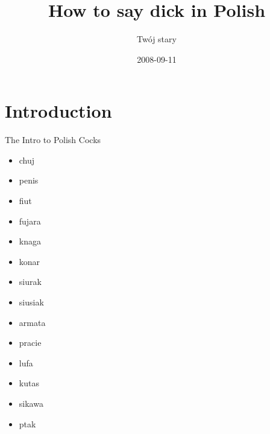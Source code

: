 \documentclass[12pt]{article}
\title{How to say dick in Polish}
\author{Twój stary}
\date{2008-09-11}
\begin{document}
\maketitle
\section{Introduction}
The Intro to Polish Cocks
\begin{itemize}
    \item chuj
    \item penis
    \item fiut
    \item fujara
    \item knaga
    \item konar
    \item siurak
    \item siusiak
    \item armata
    \item pracie
    \item lufa
    \item kutas
    \item sikawa
    \item ptak
\end{itemize}
\end{document}
